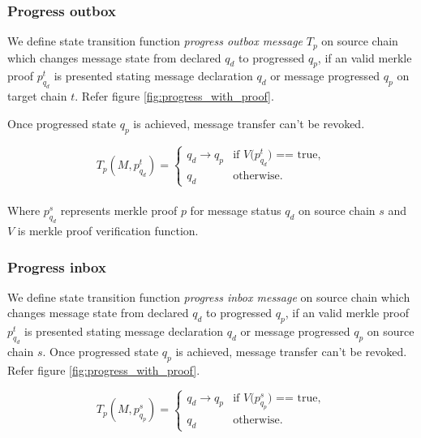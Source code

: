 \documentclass[12pt,a4paper]{article}
\begin{document}
\subsubsection{Progress outbox}\label{gateway:progressoutbox}

We define state transition function \emph{progress outbox message} $T_p$ on source chain which changes message state from declared $q_d$ to progressed $q_p$, if an valid merkle proof $p^t_{q_d}$ is presented stating message declaration $q_d$ or message progressed $q_p$ on target chain $t$. 
Refer figure \ref{fig:progress_with_proof}. 

Once progressed state $q_p$ is achieved, message transfer can’t be revoked. 

\begin{equation*}
T_p(M,p^t_{q_d})=\begin{cases}
q_d \rightarrow q_p & \text{if $V$($p^t_{q_d}$) == true},\\
q_d& \text{otherwise}.
\end{cases}
\end{equation*}
\begin{align*}
\end{align*}

Where $p^s_{q_d}$ represents merkle proof $p$ for message status $q_d$ on source chain $s$ and $V$ is merkle proof verification function.

\subsubsection{Progress inbox}\label{gateway:progressinbox}

We define state transition function \emph{progress inbox message} on source chain which changes message state from declared $q_d$ to progressed $q_p$, if an valid merkle proof $p^t_{q_d}$ is presented stating message declaration $q_d$ or message progressed $q_p$ on source chain $s$.
 Once progressed state $q_p$ is achieved, message transfer can’t be revoked. Refer figure \ref{fig:progress_with_proof}. 

\begin{equation*}
T_p(M,p^s_{q_p})=\begin{cases}
q_d \rightarrow q_p & \text{if $V$($p^s_{q_p}$) == true},\\
q_d& \text{otherwise}.
\end{cases}
\end{equation*}
\begin{align*}
\end{align*}
\end{document}

